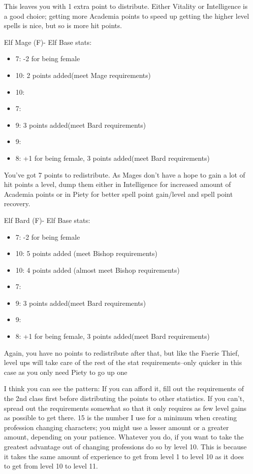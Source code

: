\documentclass[12pt]{article}
\providecommand{\tightlist}{%
  \setlength{\itemsep}{0pt}\setlength{\parskip}{0pt}}
\begin{document}
This leaves you with 1 extra point to distribute. Either Vitality or
Intelligence is a good choice; getting more Academia points to speed up
getting the higher level spells is nice, but so is more hit points.

Elf Mage (F)- Elf Base stats:

\begin{itemize}
\tightlist
\item
  7: -2 for being female
\item
  10: 2 points added(meet Mage requirements)
\item
  10:
\item
  7:
\item
  9: 3 points added(meet Bard requirements)
\item
  9:
\item
  8: +1 for being female, 3 points added(meet Bard requirements)
\end{itemize}

You've got 7 points to redistribute. As Mages don't have a hope to gain
a lot of hit points a level, dump them either in Intelligence for
increased amount of Academia points or in Piety for better spell point
gain/level and spell point recovery.

Elf Bard (F)- Elf Base stats:

\begin{itemize}
\tightlist
\item
  7: -2 for being female
\item
  10: 5 points added (meet Bishop requirements)
\item
  10: 4 points added (almost meet Bishop requirements)
\item
  7:
\item
  9: 3 points added(meet Bard requirements)
\item
  9:
\item
  8: +1 for being female, 3 points added(meet Bard requirements)
\end{itemize}

Again, you have no points to redistribute after that, but like the
Faerie Thief, level ups will take care of the rest of the stat
requirements--only quicker in this case as you only need Piety to go up
one

I think you can see the pattern: If you can afford it, fill out the
requirements of the 2nd class first before distributing the points to
other statistics. If you can't, spread out the requirements somewhat so
that it only requires as few level gains as possible to get there. 15 is
the number I use for a minimum when creating profession changing
characters; you might use a lesser amount or a greater amount, depending
on your patience. Whatever you do, if you want to take the greatest
advantage out of changing professions do so by level 10. This is because
it takes the same amount of experience to get from level 1 to level 10
as it does to get from level 10 to level 11.
\end{document}

